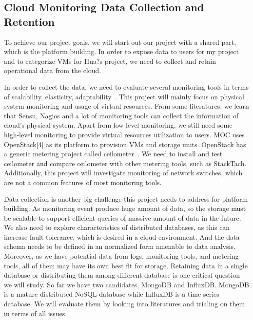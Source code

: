 \subsection{Cloud Monitoring Data Collection and Retention}

To achieve our project goals, we will start out our project with a shared part, which is the platform building. In order to expose data to users for my project and to categorize VMs for Hua?s project, we need to collect and retain operational data from the cloud. 

  In order to collect the data, we need to evaluate several monitoring tools in terms of scalability, elasticity, adaptability~\cite{Aceto2013}. This project will mainly focus on physical system monitoring and usage of virtual resources. From some literatures, we learn that Sensu, Nagios and a lot of monitoring tools can collect the information of cloud's physical system. Apart from low-level monitoring, we still need some high-level monitoring to provide virtual resources utilization to users. MOC uses OpenStack[4] as its platform to provision VMs and storage units. OpenStack has a generic metering project called ceilometer~\cite{ceilometer}. We need to install and test ceilometer and compare ceilometer with other metering tools, such as StackTach. Additionally, this project will investigate monitoring of network switches, which are not a common features of most monitoring tools. 
  
  Data collection is another big challenge this project needs to address for platform building. As monitoring event produce huge amount of data, so the storage must be scalable to support efficient queries of massive amount of data in the future. We also need to explore characteristics of distributed databases, as this can increase fault-tolerance, which is desired in a cloud environment. And the data schema needs to be defined in an normalized form amenable to data analysis. Moreover, as we have potential data from logs, monitoring tools, and metering tools, all of them may have its own best fit for storage. Retaining data in a single database or distributing them among different database is one critical question we will study. So far we have two candidates, MongoDB and InfluxDB. MongoDB is a mature distributed NoSQL database while InfluxDB is a time series database. We will evaluate them by looking into literatures and trialing on them in terms of all issues.